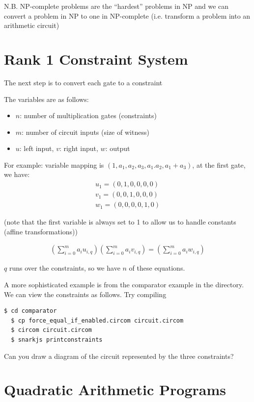 \documentclass[12pt]{article}
\begin{document}
N.B. NP-complete problems are the ``hardest'' problems in NP and we can
convert a problem in NP to one in NP-complete (i.e. transform a problem 
into an arithmetic circuit)


\section*{Rank 1 Constraint System}

The next step is to convert each gate to a constraint

The variables are as follows:
\begin{itemize}
\item $n$: number of multiplication gates (constraints)
\item $m$: number of circuit inputs (size of witness)
\item $u$: left input, $v$: right input, $w$: output 
\end{itemize}

For example: variable mapping is $(1, a_1, a_2, a_3, a_1.a_2, a_1+a_3)$,
at the first gate, we have:
\begin{align*}
u_1 = (0, 1, 0, 0, 0, 0)\\
v_1 = (0, 0, 1, 0, 0, 0)\\
w_1 = (0, 0, 0, 0, 1, 0)
\end{align*}

(note that the first variable is always set to 
1 to allow us to handle constants (affine transformations))

\begin{align*}
\left(\sum_{i=0}^m a_i u_{i,q}\right)
\left(\sum_{i=0}^m a_i v_{i,q}\right)
=
\left(\sum_{i=0}^m a_i w_{i,q}\right)
\end{align*}

$q$ runs over the constraints, so we have $n$ of these equations.


A more sophisticated example is from the comparator 
example in the directory. We can view the constraints
as follows. Try compiling 

\begin{lstlisting}[language=bash]
  $ cd comparator
  $ cp force_equal_if_enabled.circom circuit.circom 
  $ circom circuit.circom
  $ snarkjs printconstraints
\end{lstlisting}

Can you draw a diagram of the circuit represented by the 
three constraints?

\section*{Quadratic Arithmetic Programs}
\end{document}
